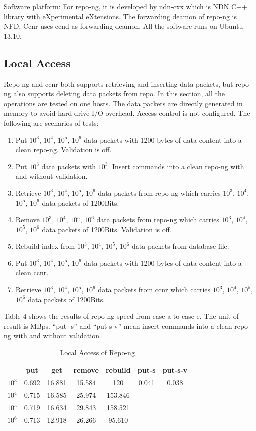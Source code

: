 \documentclass{acm_proc_article-sp}
\begin{document}
Software platform:
For repo-ng, it is developed by ndn-cxx \cite{ndn-cxx} which is NDN C++ library with eXperimental eXtensions. The forwarding deamon of repo-ng is NFD. \cite{NFD} Ccnr uses ccnd \cite{ccnd} as forwarding deamon. All the software runs on Ubuntu 13.10.

\subsection{Local Access}

Repo-ng and ccnr both supports retrieving and inserting data packets, but repo-ng also supports deleting data packets from repo. In this section, all the operations are tested on one hosts. The data packets are directly generated in memory to avoid hard drive I/O overhead. Access control is not configured. The following are scenarios of tests:

\begin{enumerate}[a]
\item Put $10^3$, $10^4$, $10^5$, $10^6$ data packets with 1200 bytes of data content into a clean repo-ng. Validation is off.
\item Put $10^3$ data packets with $10^3$. Insert commands into a clean repo-ng with and without validation.
\item Retrieve $10^3$, $10^4$, $10^5$, $10^6$ data packets from repo-ng which carries $10^3$, $10^4$, $10^5$, $10^6$ data packets of 1200Bits.
\item Remove $10^3$, $10^4$, $10^5$, $10^6$ data packets from repo-ng which carries $10^3$, $10^4$, $10^5$, $10^6$ data packets of 1200Bits. Validation is off.
\item Rebuild index from $10^3$, $10^4$, $10^5$, $10^6$ data packets from database file.
\item Put $10^3$, $10^4$, $10^5$, $10^6$ data packets with 1200 bytes of data content into a clean ccnr.
\item Retrieve $10^3$, $10^4$, $10^5$, $10^6$ data packets from ccnr which carries $10^3$, $10^4$, $10^5$, $10^6$ data packets of 1200Bits.
\end{enumerate}

Table 4 shows the results of repo-ng speed from case a to case e. The unit of result is MBps. ``put -s'' and ``put-s-v'' mean insert commands into a clean repo-ng with and without validation

\begin{table}
\centering
\begin{tabular}{ | c | c | c | c | c | c | c | }
    \hline
           & put & get & remove & rebuild & put-s & put-s-v \\ \hline
    $10^3$ & 0.692 & 16.881 & 15.584 & 120 & 0.041 & 0.038  \\ \hline
    $10^4$ & 0.715 & 16.585 & 25.974 & 153.846 & & \\ \hline
    $10^5$ & 0.719 & 16.634 & 29.843 & 158.521 & & \\ \hline
    $10^6$ & 0.713 & 12.918 & 26.266 & 95.610 & &\\ \hline
\end{tabular}
\caption{Local Access of Repo-ng}
\end{table}
\end{document}
